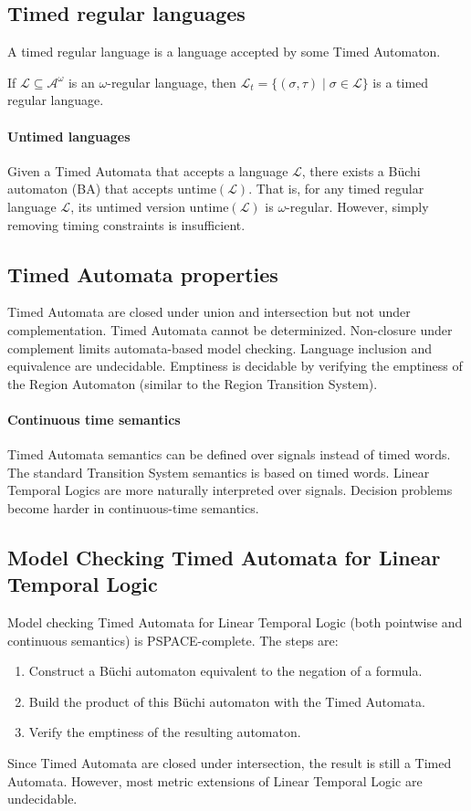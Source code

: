 \subsection{Timed regular languages}
\begin{definition}
    A timed regular language is a language accepted by some Timed Automaton.
\end{definition}
\noindent If $\mathcal{L} \subseteq \mathcal{A}^\omega$ is an $\omega$-regular language, then $\mathcal{L}_t = \{ (\sigma, \tau) \mid \sigma \in \mathcal{L} \}$ is a timed regular language.

\paragraph*{Untimed languages}
Given a Timed Automata that accepts a language $\mathcal{L}$, there exists a Büchi automaton (BA) that accepts $\text{untime}(\mathcal{L})$.
That is, for any timed regular language $\mathcal{L}$, its untimed version $\text{untime}(\mathcal{L})$ is $\omega$-regular.
However, simply removing timing constraints is insufficient. 


\subsection{Timed Automata properties}
Timed Automata are closed under union and intersection but not under complementation.
Timed Automata cannot be determinized.
Non-closure under complement limits automata-based model checking.
Language inclusion and equivalence are undecidable.
Emptiness is decidable by verifying the emptiness of the Region Automaton (similar to the Region Transition System).

\paragraph*{Continuous time semantics}
Timed Automata semantics can be defined over signals instead of timed words.
The standard Transition System semantics is based on timed words.
Linear Temporal Logics are more naturally interpreted over signals.
Decision problems become harder in continuous-time semantics.

\subsection{Model Checking Timed Automata for Linear Temporal Logic}
Model checking Timed Automata for Linear Temporal Logic (both pointwise and continuous semantics) is PSPACE-complete.
The steps are: 
\begin{enumerate}
    \item Construct a Büchi automaton equivalent to the negation of a formula.
    \item Build the product of this Büchi automaton with the Timed Automata.
    \item Verify the emptiness of the resulting automaton.
\end{enumerate}
\noindent Since Timed Automata are closed under intersection, the result is still a Timed Automata.
However, most metric extensions of Linear Temporal Logic are undecidable.